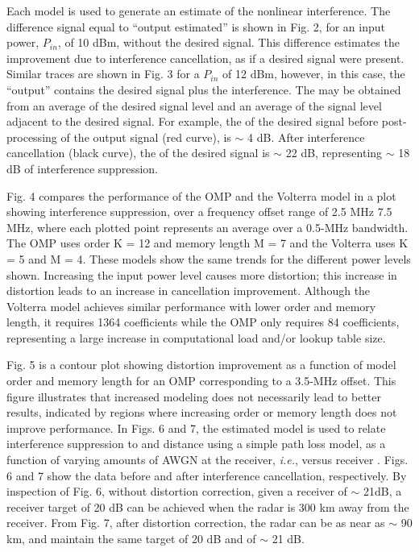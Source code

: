 Each model is used to generate an estimate of the nonlinear interference.  The difference signal equal to ``output \textendash\hspace{1pt} estimated'' is shown in Fig. 2, for an input power, $P_{in}$, of 10 dBm, without the desired signal. This difference estimates the improvement due to interference cancellation, as if a desired signal were present.  Similar traces are shown in Fig. 3 for a $P_{in}$ of 12 dBm, however, in this case, the ``output'' contains the desired signal plus the interference.  The \SINR may be obtained from an average of the desired signal level and an average of the signal level adjacent to the desired signal.  For example, the \SINR of the desired signal before post-processing of the output signal (red curve), is $\sim$ 4 dB.  After interference cancellation  (black curve), the \SINR of the desired signal is $\sim$ 22 dB, representing $\sim$ 18 dB of interference suppression.\par
Fig. 4 compares the performance of the OMP and the Volterra model in a plot showing interference suppression, over a frequency offset range of 2.5 MHz \textendash\hspace{0.25pt} 7.5 MHz, where each plotted point represents an average over a 0.5-MHz bandwidth.    The OMP uses order K = 12 and  memory length M = 7 and the Volterra uses K = 5 and M = 4.  These models show the same trends for the different power levels shown.  Increasing the input power level causes more distortion; this increase in distortion leads to an increase in cancellation improvement.  Although the Volterra model achieves similar performance with lower order and memory length, it requires 1364 coefficients while the  OMP only requires 84 coefficients, representing a large increase in computational load and/or lookup table size.  \par
Fig. 5 is a contour plot showing distortion improvement as a function of model order and memory length for an OMP corresponding to a 3.5-MHz offset.  This figure illustrates that increased modeling does not necessarily lead to better results, indicated by regions where increasing order or memory length does not improve performance.  
In Figs. 6 and 7, the estimated model is used to relate interference suppression to \SINR and distance using a simple path loss model, as a function of varying amounts of AWGN at the receiver, \emph{i.e.}, versus receiver \SNR.  Figs. 6 and 7 show the data before and after interference cancellation, respectively.  By inspection of Fig. 6, without distortion correction, given a receiver \SNR of $\sim$ 21dB, a receiver target \SINR of 20 dB can be achieved when the radar is 300 km away from the receiver.  From Fig. 7, after distortion correction, the radar can be as near as $\sim$ 90 km, and maintain the same target \SINR of 20 dB and \SNR of $\sim$ 21 dB.  

